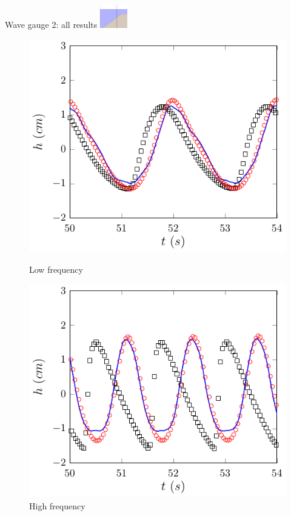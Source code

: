 \documentclass[pdf]{beamer}
\begin{document}
\begin{frame}{Wave gauge 2: all results \space\space	\includegraphics[width=1.2cm]{./Pics/WT2z.pdf}  }
	\begin{figure}
		\centering
		\begin{minipage}{.5\textwidth}
			\centering
			\includegraphics[width=0.9\linewidth]{./Pics/SL/WG2/1-figure0.pdf}
			\caption{Low frequency}
		\end{minipage}%
		\begin{minipage}{.5\textwidth}
			\centering
			\includegraphics[width=0.9\linewidth]{./Pics/SH/WG2/1-figure0.pdf}
			\caption{High frequency}
		\end{minipage}
	\end{figure}
\end{frame}
\end{document}
